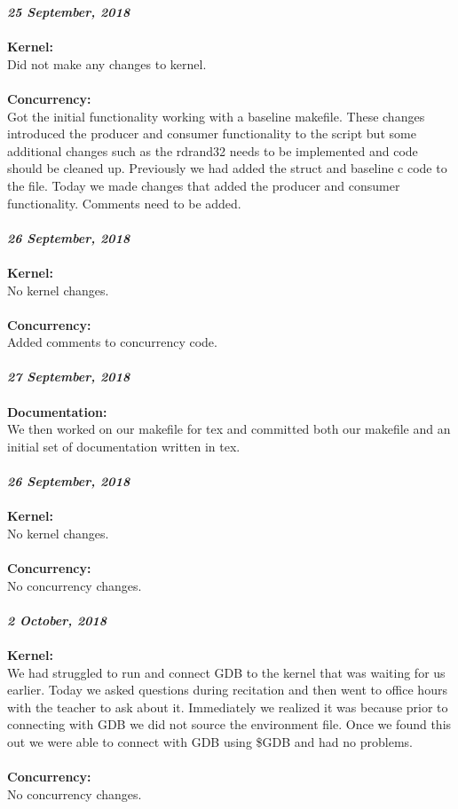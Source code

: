 \documentclass{article}
\begin{document}
\noindent
\textit{\textbf{25 September, 2018}} \\\\
\textbf{Kernel:} \\
\indent Did not make any changes to kernel.
\\\\
\textbf{Concurrency:} \\
\indent Got the initial functionality working with a baseline makefile. These changes introduced the producer and consumer functionality to the script but some additional changes such as the rdrand32 needs to be implemented and code should be cleaned up. Previously we had added the struct and baseline c code to the file. Today we made changes that added the producer and consumer functionality. Comments need to be added.
\\\\

\noindent
\textit{\textbf{26 September, 2018}} \\\\
\textbf{Kernel:} \\
\indent No kernel changes.
\\\\
\textbf{Concurrency:} \\
\indent Added comments to concurrency code.
\\\\

\noindent
\textit{\textbf{27 September, 2018}} \\\\
\textbf{Documentation:} \\
\indent We then worked on our makefile for tex and committed both our makefile and an initial set of documentation written in tex.
\\\\

\noindent
\textit{\textbf{26 September, 2018}} \\\\
\textbf{Kernel:} \\
\indent No kernel changes.
\\\\
\textbf{Concurrency:} \\
\indent No concurrency changes.
\\\\

\noindent
\textit{\textbf{2 October, 2018}} \\\\
\textbf{Kernel:} \\
\indent We had struggled to run and connect GDB to the kernel that was waiting for us earlier. Today we asked questions during recitation and then went to office hours with the teacher to ask about it. Immediately we realized it was because prior to connecting with GDB we did not source the environment file. Once we found this out we were able to connect with GDB using \$GDB and had no problems.
\\\\
\textbf{Concurrency:} \\
\indent No concurrency changes.
\\\\
\end{document}
